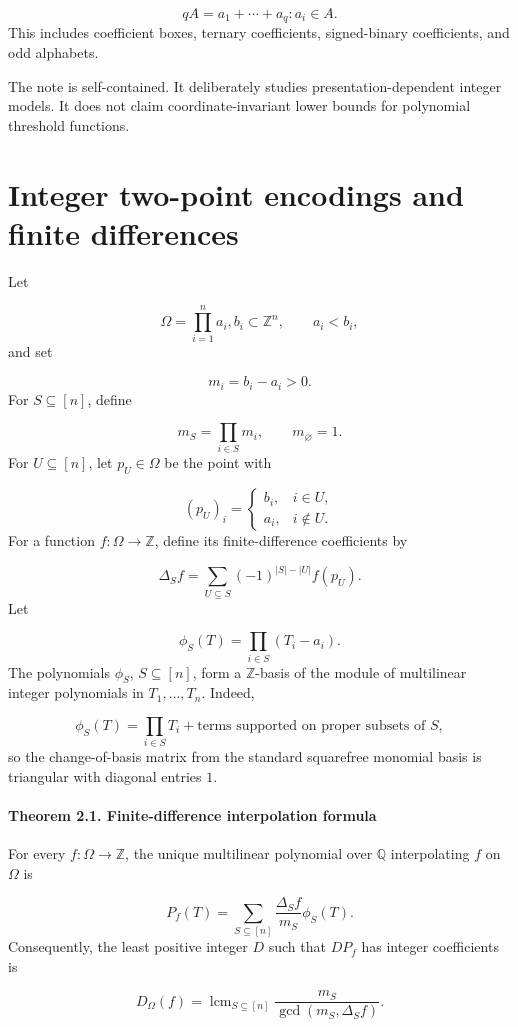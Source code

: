 \documentclass[11pt]{article}
\theoremstyle{definition}
\begin{document}
\[
qA={a_1+\cdots+a_q:a_i\in A}.
\]
This includes coefficient boxes, ternary coefficients, signed-binary coefficients, and odd alphabets.

The note is self-contained. It deliberately studies presentation-dependent integer models. It does not claim coordinate-invariant lower bounds for polynomial threshold functions.

\section{Integer two-point encodings and finite differences}
Let

\[
\Omega=\prod_{i=1}^n{a_i,b_i}\subset\mathbb{Z}^n,
\qquad
a_i<b_i,
\]
and set

\[
m_i=b_i-a_i>0.
\]
For $S\subseteq[n]$, define

\[
m_S=\prod_{i\in S}m_i,
\qquad
m_\varnothing=1.
\]
For $U\subseteq[n]$, let $p_U\in\Omega$ be the point with

\[
(p_U)_i=
\begin{cases}
b_i,& i\in U,\\
a_i,& i\notin U.
\end{cases}
\]
For a function $f:\Omega\to\mathbb{Z}$, define its finite-difference coefficients by

\[
\Delta_S f
=
\sum_{U\subseteq S}
(-1)^{|S|-|U|}
f(p_U).
\]
Let

\[
\phi_S(T)=\prod_{i\in S}(T_i-a_i).
\]
The polynomials $\phi_S$, $S\subseteq[n]$, form a $\mathbb{Z}$-basis of the module of multilinear integer polynomials in $T_1,\dots,T_n$. Indeed,

\[
\phi_S(T)
=
\prod_{i\in S}T_i
+
\text{terms supported on proper subsets of }S,
\]
so the change-of-basis matrix from the standard squarefree monomial basis is triangular with diagonal entries $1$.

\paragraph{Theorem 2.1. Finite-difference interpolation formula}
For every $f:\Omega\to\mathbb{Z}$, the unique multilinear polynomial over $\mathbb{Q}$ interpolating $f$ on $\Omega$ is

\[
P_f(T)
=
\sum_{S\subseteq[n]}
\frac{\Delta_S f}{m_S}\phi_S(T).
\]
Consequently, the least positive integer $D$ such that $D P_f$ has integer coefficients is

\[
D_\Omega(f)
=
\operatorname{lcm}_{S\subseteq[n]}
\frac{m_S}{\gcd(m_S,\Delta_S f)}.
\]
\end{document}
